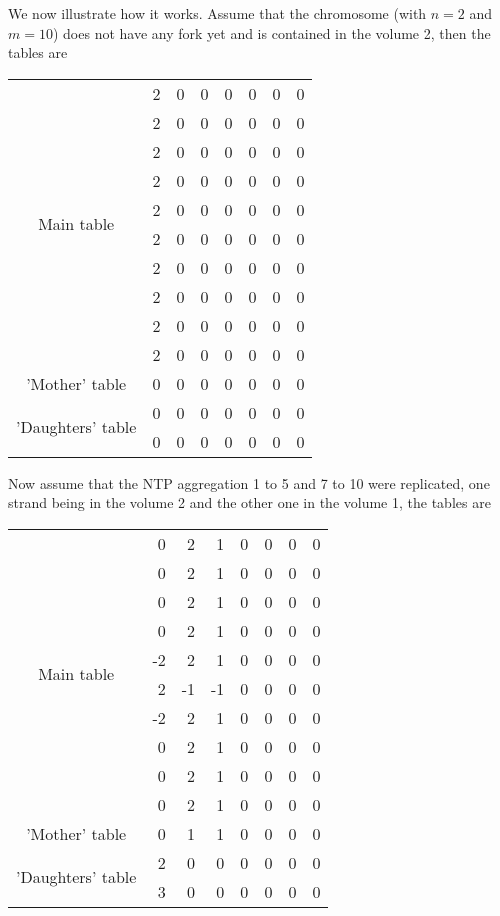 We now illustrate how it works. Assume that the chromosome (with $n=2$ and $m=10$) does not have any fork yet and is contained in the volume 2, then the tables are
\begin{center}
  \begin{tabular}{|c|r|r|r|r|r|r|r|}
     \hline
     \multirow{10}{*}{Main table} & 2 & 0 & 0 & 0 & 0 & 0 & 0 \\
     & 2 & 0 & 0 & 0 & 0 & 0 & 0 \\
     & 2 & 0 & 0 & 0 & 0 & 0 & 0 \\
     & 2 & 0 & 0 & 0 & 0 & 0 & 0 \\
     & 2 & 0 & 0 & 0 & 0 & 0 & 0 \\
     & 2 & 0 & 0 & 0 & 0 & 0 & 0 \\
     & 2 & 0 & 0 & 0 & 0 & 0 & 0 \\
     & 2 & 0 & 0 & 0 & 0 & 0 & 0 \\
     & 2 & 0 & 0 & 0 & 0 & 0 & 0 \\
     & 2 & 0 & 0 & 0 & 0 & 0 & 0 \\
     \hline \hline
     'Mother' table & 0 & 0 & 0 & 0 & 0 & 0 & 0 \\
     \hline \hline
     \multirow{2}{*}{'Daughters' table} & 0 & 0 & 0 & 0 & 0 & 0 & 0 \\
     & 0 & 0 & 0 & 0 & 0 & 0 & 0 \\
     \hline
   \end{tabular}
\end{center}
Now assume that the NTP aggregation 1 to 5 and 7 to 10 were replicated, one strand being in the volume 2 and the other one in the volume 1, the tables are
\begin{center}
  \begin{tabular}{|c|r|r|r|r|r|r|r|}
     \hline
     \multirow{10}{*}{Main table} & 0 &  2 &  1 & 0 & 0 & 0 & 0 \\
     &  0 &  2 &  1 & 0 & 0 & 0 & 0 \\
     &  0 &  2 &  1 & 0 & 0 & 0 & 0 \\
     &  0 &  2 &  1 & 0 & 0 & 0 & 0 \\
     & -2 &  2 &  1 & 0 & 0 & 0 & 0 \\
     &  2 & -1 & -1 & 0 & 0 & 0 & 0 \\
     & -2 &  2 &  1 & 0 & 0 & 0 & 0 \\
     &  0 &  2 &  1 & 0 & 0 & 0 & 0 \\
     &  0 &  2 &  1 & 0 & 0 & 0 & 0 \\
     &  0 &  2 &  1 & 0 & 0 & 0 & 0 \\
     \hline \hline
     'Mother' table & 0 & 1 & 1 & 0 & 0 & 0 & 0 \\
     \hline \hline
     \multirow{2}{*}{'Daughters' table} & 2 & 0 & 0 & 0 & 0 & 0 & 0 \\
     & 3 & 0 & 0 & 0 & 0 & 0 & 0 \\
     \hline
   \end{tabular}
\end{center}

